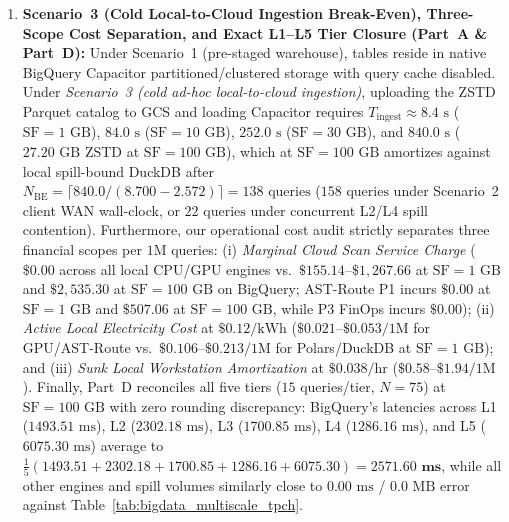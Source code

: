 \documentclass[10pt,a4paper]{article}
\begin{document}
\begin{enumerate}[leftmargin=1.5em,itemsep=0.8pt]
    \item \textbf{Scenario~3 (Cold Local-to-Cloud Ingestion Break-Even), Three-Scope Cost Separation, and Exact L1--L5 Tier Closure (Part~A \& Part~D):} Under Scenario~1 (pre-staged warehouse), tables reside in native BigQuery Capacitor partitioned/clustered storage with query cache disabled. Under \emph{Scenario~3 (cold ad-hoc local-to-cloud ingestion)}, uploading the ZSTD Parquet catalog to GCS and loading Capacitor requires $T_{\text{ingest}} \approx 8.4\text{ s}$ ($\text{SF}=1\text{ GB}$), $84.0\text{ s}$ ($\text{SF}=10\text{ GB}$), $252.0\text{ s}$ ($\text{SF}=30\text{ GB}$), and $840.0\text{ s}$ ($27.20\text{ GB}$ ZSTD at $\text{SF}=100\text{ GB}$), which at $\text{SF}=100\text{ GB}$ amortizes against local spill-bound DuckDB after $N_{\text{BE}} = \lceil 840.0 / (8.700 - 2.572) \rceil = 138\text{ queries}$ ($158\text{ queries}$ under Scenario~2 client WAN wall-clock, or $22\text{ queries}$ under concurrent L2/L4 spill contention). Furthermore, our operational cost audit strictly separates three financial scopes per $1\text{M}$ queries: (i) \emph{Marginal Cloud Scan Service Charge} ($\$0.00$ across all local CPU/GPU engines vs.\ $\$155.14\text{--}\$1{,}267.66$ at $\text{SF}=1\text{ GB}$ and $\$2{,}535.30$ at $\text{SF}=100\text{ GB}$ on BigQuery; AST-Route P1 incurs $\$0.00$ at $\text{SF}=1\text{ GB}$ and $\$507.06$ at $\text{SF}=100\text{ GB}$, while P3 FinOps incurs $\$0.00$); (ii) \emph{Active Local Electricity Cost} at $\$0.12/\text{kWh}$ ($\$0.021\text{--}\$0.053/1\text{M}$ for GPU/AST-Route vs.\ $\$0.106\text{--}\$0.213/1\text{M}$ for Polars/DuckDB at $\text{SF}=1\text{ GB}$); and (iii) \emph{Sunk Local Workstation Amortization} at $\$0.038/\text{hr}$ ($\$0.58\text{--}\$1.94/1\text{M}$). Finally, Part~D reconciles all five tiers ($15$ queries/tier, $N=75$) at $\text{SF}=100\text{ GB}$ with zero rounding discrepancy: BigQuery's latencies across L1 ($1493.51\text{ ms}$), L2 ($2302.18\text{ ms}$), L3 ($1700.85\text{ ms}$), L4 ($1286.16\text{ ms}$), and L5 ($6075.30\text{ ms}$) average to $\frac{1}{5}(1493.51+2302.18+1700.85+1286.16+6075.30) = \mathbf{2571.60\text{ ms}}$, while all other engines and spill volumes similarly close to $0.00\text{ ms}$ / $0.0\text{ MB}$ error against Table~\ref{tab:bigdata_multiscale_tpch}.
\end{enumerate}

\end{document}
